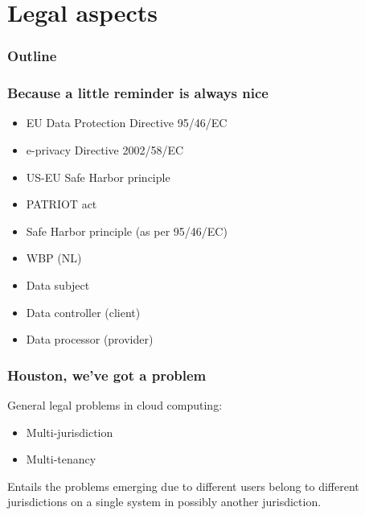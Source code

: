 \documentclass{beamer}
\begin{document}
\section{Legal aspects}

\begin{frame}
  \frametitle{Outline}
\end{frame}

\begin{frame}
    \frametitle{Because a little reminder is always nice}
    \begin{itemize}
        \item EU Data Protection Directive 95/46/EC
        \item e-privacy Directive 2002/58/EC %
        \item US-EU Safe Harbor principle
        \item PATRIOT act
        \item Safe Harbor principle (as per 95/46/EC)
        \item WBP (NL)
    \end{itemize}

    \begin{itemize}
        \item Data subject
        \item Data controller (client) \checkmark
        \item Data processor (provider) \checkmark
    \end{itemize}
\end{frame}

\begin{frame}
    \frametitle{Houston, we've got a problem}
    General legal problems in cloud computing:
    \begin{itemize}
        \item Multi-jurisdiction
        \item Multi-tenancy
    \end{itemize}

    \begin{block}
        Entails the problems emerging due to different users belong to
        different jurisdictions on a single system in possibly another
        jurisdiction.
    \end{block}
\end{frame}
\end{document}
